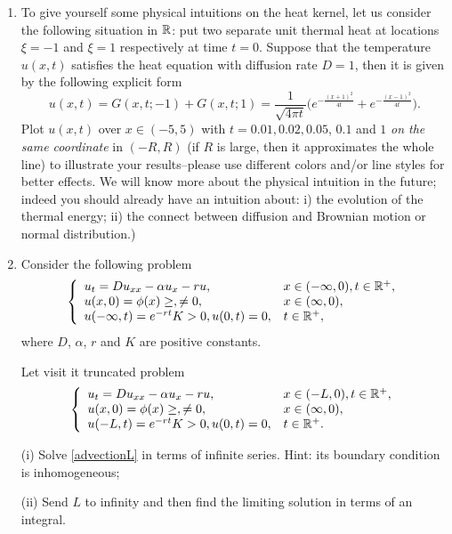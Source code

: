 \documentclass[6pt]{article}
\numberwithin{equation}{section}
\def\mathbb{\Bbb}
\begin{document}
\begin{enumerate}
\item To give yourself some physical intuitions on the heat kernel, let us consider the following situation in $\mathbb R$: put two separate unit thermal heat at locations $\xi=-1$ and $\xi=1$ respectively at time $t=0$.  Suppose that the temperature $u(x,t)$ satisfies the heat equation with diffusion rate $D=1$, then it is given by the following explicit form
    \[u(x,t)=G(x,t;-1)+G(x,t;1)=\frac{1}{\sqrt{4\pi t}}\Big(e^{-\frac{(x+1)^2}{4t}}+e^{-\frac{(x-1)^2}{4t}}\Big).\]
Plot $u(x,t)$ over $x\in(-5,5)$ with $t=0.01, 0.02, 0.05$, $0.1$ and $1$ \emph{on the same coordinate} in $(-R,R)$ (if $R$ is large, then it approximates the whole line)  to illustrate your results--please use different colors and/or line styles for better effects.  We will know more about the physical intuition in the future; indeed you should already have an intuition about: i) the evolution of the thermal energy; ii) the connect between diffusion and Brownian motion or normal distribution.)

\item

Consider the following problem
\begin{equation}\label{advection}
\left\{
\begin{array}{ll}
u_t=D u_{xx}-\alpha u_x-ru,& x\in (-\infty,0), t\in\mathbb R^+,\\
u(x,0)=\phi(x)\geq,\neq0,&x \in (\infty,0),\\
u(-\infty,t)=e^{-rt}K>0,u(0,t)=0,& t\in\mathbb R^+,\\
\end{array}
\right.
\end{equation}
where $D$, $\alpha$, $r$ and $K$ are positive constants.

Let visit it truncated problem
\begin{equation}\label{advectionL}
\left\{
\begin{array}{ll}
u_t=D u_{xx}-\alpha u_x-ru,& x\in (-L,0), t\in\mathbb R^+,\\
u(x,0)=\phi(x)\geq,\neq0,&x \in (\infty,0),\\
u(-L,t)=e^{-rt}K>0,u(0,t)=0,& t\in\mathbb R^+.\\
\end{array}
\right.
\end{equation}


(i) Solve \eqref{advectionL} in terms of infinite series.  Hint: its boundary condition is inhomogeneous;

(ii) Send $L$ to infinity and then find the limiting solution in terms of an integral.



\end{enumerate}
\end{document}
